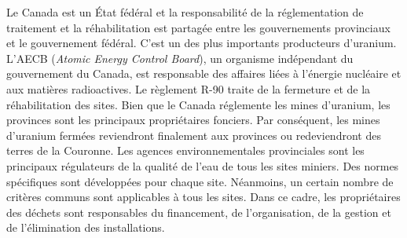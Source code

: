 \documentclass{article}
\begin{document}
Le Canada est un État fédéral et la responsabilité de la réglementation de traitement et la réhabilitation est partagée entre les gouvernements provinciaux et le gouvernement fédéral.
C'est un des plus importants producteurs d'uranium.
L'AECB (\textit{Atomic Energy Control Board}), un organisme indépendant du gouvernement du Canada, est responsable des affaires liées à l'énergie nucléaire et aux matières radioactives. Le règlement R-90 traite de la fermeture et de la réhabilitation des sites. Bien que le Canada réglemente les mines d'uranium, les provinces sont les principaux propriétaires fonciers. Par conséquent, les mines d'uranium fermées reviendront finalement aux provinces ou redeviendront des terres de la Couronne. Les agences environnementales provinciales sont les principaux régulateurs de la qualité de l'eau de tous les sites miniers.
Des normes spécifiques sont développées pour chaque site. Néanmoins, un certain nombre de critères communs sont applicables à tous les sites.
Dans ce cadre, les propriétaires des déchets sont responsables du financement, de l'organisation, de la gestion et de l’élimination des installations.
\end{document}
